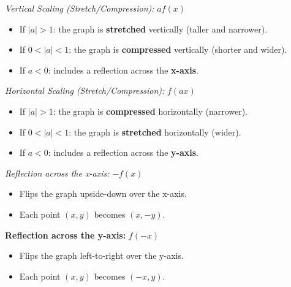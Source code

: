 	\emph{Vertical Scaling (Stretch/Compression):} \( a f(x) \)
	      \begin{itemize}[label=\(-\)]
		      \item If \( |a| > 1 \): the graph is \textbf{stretched} vertically (taller and narrower).
		      \item If \( 0 < |a| < 1 \): the graph is \textbf{compressed} vertically (shorter and wider).
		      \item If \( a < 0 \): includes a reflection across the \textbf{x-axis}.
	      \end{itemize}

	\emph{Horizontal Scaling (Stretch/Compression):} \( f(a x) \)
	      \begin{itemize}[label=\(-\)]
		      \item If \( |a| > 1 \): the graph is \textbf{compressed} horizontally (narrower).
		      \item If \( 0 < |a| < 1 \): the graph is \textbf{stretched} horizontally (wider).
		      \item If \( a < 0 \): includes a reflection across the \textbf{y-axis}.
	      \end{itemize}

	 \emph{Reflection across the x-axis:} \( -f(x) \)
	      \begin{itemize}[label=\(-\)]
		      \item Flips the graph upside-down over the x-axis.
		      \item Each point \( (x, y) \) becomes \( (x, -y) \).
	      \end{itemize}

	\textbf{Reflection across the y-axis:} \( f(-x) \)
	      \begin{itemize}[label=\(-\)]
		      \item Flips the graph left-to-right over the y-axis.
		      \item Each point \( (x, y) \) becomes \( (-x, y) \).
	      \end{itemize}
